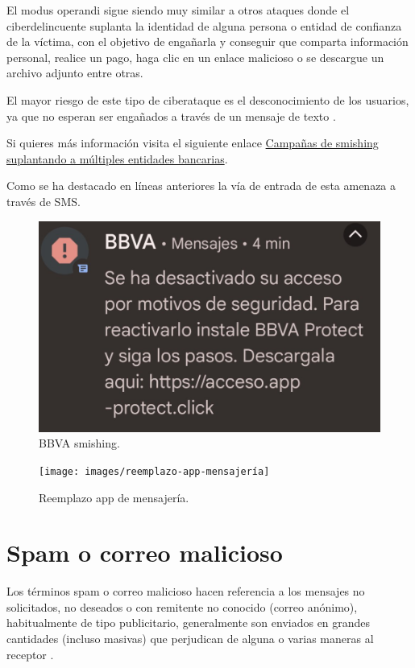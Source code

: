 \documentclass[
  spanish,
  a4paper,
  openany]{book}
\begin{document}
El modus operandi sigue siendo muy similar a otros ataques donde el ciberdelincuente suplanta la identidad de alguna persona o entidad de confianza de la víctima, con el objetivo de engañarla y conseguir que comparta información personal, realice un pago, haga clic en un enlace malicioso o se descargue un archivo adjunto entre otras.

El mayor riesgo de este tipo de ciberataque es el desconocimiento de los usuarios, ya que no esperan ser engañados a través de un mensaje de texto \citep{INCI-smishing}.

Si quieres más información visita el siguiente enlace \href{https://www.incibe.es/protege-tu-empresa/avisos-seguridad/campanas-smishing-suplantando-multiples-entidades-bancarias}{Campañas de smishing suplantando a múltiples entidades bancarias}.

Como se ha destacado en líneas anteriores la vía de entrada de esta amenaza a través de SMS.

\begin{figure}

{\centering \includegraphics[width=0.35\linewidth]{images/bbva-smishing} 

}

\caption{BBVA smishing.}\label{fig:unnamed-chunk-18}
\end{figure}

\begin{figure}

{\centering \texttt{[image: images/reemplazo-app-mensajería]} 

}

\caption{Reemplazo app de mensajería.}\label{fig:unnamed-chunk-19}
\end{figure}

\hypertarget{spam-o-correo-malicioso}{%
\section{Spam o correo malicioso}\label{spam-o-correo-malicioso}}

Los términos spam o correo malicioso hacen referencia a los mensajes no solicitados, no deseados o con remitente no conocido (correo anónimo), habitualmente de tipo publicitario, generalmente son enviados en grandes cantidades (incluso masivas) que perjudican de alguna o varias maneras al receptor \citep{WIKI-spam}.
\end{document}
